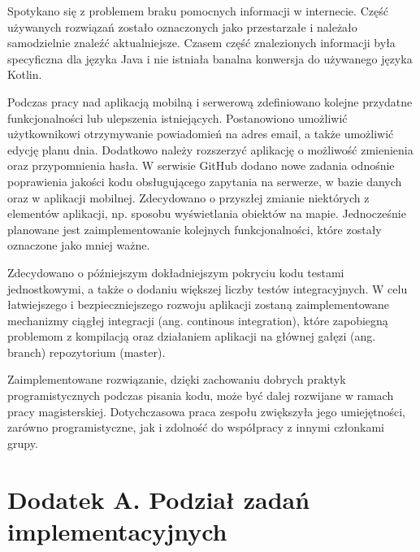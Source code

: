\documentclass[10pt,twoside,a4paper]{report}
\begin{document}
\par Spotykano się z problemem braku pomocnych informacji w internecie. Część używanych rozwiązań zostało oznaczonych jako przestarzałe i należało samodzielnie znaleźć aktualniejsze. Czasem część znalezionych informacji była specyficzna dla języka Java i nie istniała banalna konwersja do używanego języka Kotlin.

\par Podczas pracy nad aplikacją mobilną i serwerową zdefiniowano kolejne przydatne funkcjonalności lub ulepszenia istniejących. Postanowiono umożliwić użytkownikowi otrzymywanie powiadomień na adres email, a także umożliwić edycję planu dnia. Dodatkowo należy rozszerzyć aplikację o możliwość zmienienia oraz przypomnienia hasła. W serwisie GitHub dodano nowe zadania odnośnie poprawienia jakości kodu obsługującego zapytania na serwerze, w bazie danych oraz w aplikacji mobilnej. Zdecydowano o przyszłej zmianie niektórych z elementów aplikacji, np. sposobu wyświetlania obiektów na mapie. Jednocześnie planowane jest zaimplementowanie kolejnych funkcjonalności, które zostały oznaczone jako mniej ważne.

\par Zdecydowano o późniejszym dokładniejszym pokryciu kodu testami jednostkowymi, a także o dodaniu większej liczby testów integracyjnych. W celu łatwiejszego i bezpieczniejszego rozwoju aplikacji zostaną zaimplementowane mechanizmy ciągłej integracji (ang. continous integration), które zapobiegną problemom z kompilacją oraz działaniem aplikacji na głównej gałęzi (ang. branch) repozytorium (master).

\par Zaimplementowane rozwiązanie, dzięki zachowaniu dobrych praktyk programistycznych podczas pisania kodu, może być dalej rozwijane w ramach pracy magisterskiej. Dotychczasowa praca zespołu zwiększyła jego umiejętności, zarówno programistyczne, jak i zdolność do współpracy z innymi członkami grupy.

\chapter*{ Dodatek A. Podział zadań implementacyjnych}

\end{document}
